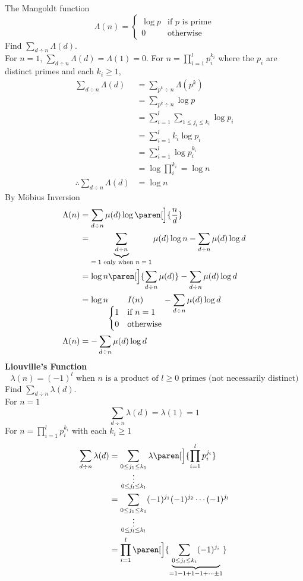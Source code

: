 \eg The Mangoldt function
\[ \Lambda(n) = \begin{cases}
\log p & \text{if $p$ is prime} \\
0 & \text{otherwise}
\end{cases} \]
Find $\sum_{d\div n}\Lambda(d)$. \\
\soln For $n=1$, $\sum_{d\div n}\Lambda(d)=\Lambda(1)=0$.  For $n=\prod_{i=1}^l p_i^{k_i}$ where the $p_i$ are distinct primes and each $k_i\geq1$,
\begin{align*}
\sum_{d\div n}\Lambda(d) &= \sum_{p^k\div n}\Lambda(p^k) \\
&= \sum_{p^k\div n}\log p \\
&= \sum_{i=1}^l \sum_{1\leq j_i\leq k_i}\log p_i \\
&= \sum_{i=1}^l k_i\log p_i \\
&= \sum_{i=1}^l \log p_i^{k_i} \\
&= \log \prod_i^{k_i} = \log n \\
\therefore \sum_{d\div n}\Lambda(d) &= \log n
\end{align*}
\eg By M\"obius Inversion
\begin{align*}
\Lambda(n) &= \sum_{d\div n}\mu(d)\log\paren[\Big]{\frac nd} \\
&= \underbrace{\sum_{d\div n}}_{\text{$=1$ only when $n=1$}}\mu(d)\log n - \sum_{d\div n}\mu(d)\log d \\
&= \log n\paren[\Big]{\sum_{d\div n}\mu(d)} - \sum_{d\div n}\mu(d)\log d \\
&= \log n \underset{\begin{cases}
1 & \text{if $n=1$} \\
0 & \text{otherwise}
\end{cases}}{I(n)} - \sum_{d\div n}\mu(d)\log d \\
\Lambda(n) &= - \sum_{d\div n}\mu(d)\log d
\end{align*}
\eg\textbf{Liouville's Function} \\
\[ \lambda(n) = (-1)^l \text{ when $n$ is a product of $l\geq0$ primes (not necessarily distinct)} \]
Find $\sum_{d\div n}\lambda(d)$. \\
\soln For $n=1$
\[ \sum_{d\div n}\lambda(d) = \lambda(1) = 1 \]
For $n=\prod_{i=1}^l p_i^{k_i}$ with each $k_i\geq1$
\begin{align*}
\sum_{d\div n}\lambda(d) &= \sum_{\substack{0\leq j_1\leq k_1\\\vdots\\0\leq j_l\leq k_l}}\lambda\paren[\Big]{\prod_{i=1}^l p_i^{j_i}} \\
&= \sum_{\substack{0\leq j_1\leq k_1\\\vdots\\0\leq j_l\leq k_l}}(-1)^{j_1}(-1)^{j_2}\dotsm(-1)^{j_l} \\
&= \prod_{i=1}^l\paren[\Big]{\underbrace{\sum_{0\leq j_i\leq k_i}(-1)^{j_i}}_{=1-1+1-1+\dotsb\pm1}}
\end{align*}
